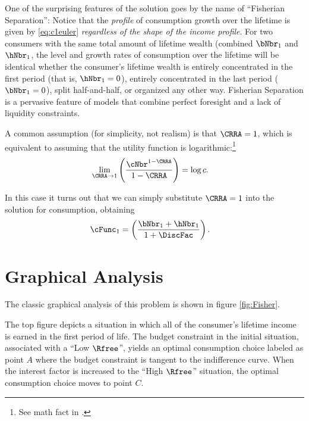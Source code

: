   One of the surprising features of the solution goes by the name of ``Fisherian Separation'':  Notice that the \textit{profile} of consumption growth over the lifetime is given by \eqref{eq:c1euler} \textit{regardless of the shape of the income profile}.  For two consumers with the same total amount of lifetime wealth (combined $\bNbr_{1}$ and $\hNbr_{1}$, the level and growth rates of consumption over the lifetime will be identical whether the consumer's lifetime wealth is entirely concentrated in the first period (that is, $\hNbr_{1}=0$), entirely concentrated in the last period ($\bNbr_{1}=0$), split half-and-half, or organized any other way. Fisherian Separation is a pervasive feature of models that combine perfect foresight and a lack of liquidity constraints.

  A common assumption (for simplicity, not realism) is that $\CRRA=1$, which
  is equivalent to assuming that the utility function is logarithmic:\footnote{See
    math fact \CRRALim in \MathFactsList.}
  \begin{equation}\begin{gathered}\begin{aligned}
        \lim_{\CRRA \rightarrow 1} \left(\frac{\cNbr^{1-\CRRA}}{1-\CRRA}\right) & =  \log c.
      \end{aligned}\end{gathered}\end{equation}

  In this case it turns out that we can simply substitute $\CRRA=1$ into the
  solution for consumption, obtaining
  \begin{equation}\begin{gathered}\begin{aligned}
        \cFunc_{1} & =  \left(\frac{\bNbr_{1}+\hNbr_{1}}{1+\DiscFac}\right).
      \end{aligned}\end{gathered}\end{equation}


  \section{Graphical Analysis}

  The classic graphical analysis of this problem is shown in figure \ref{fig:Fisher}.

  The top figure depicts a situation in which all of the consumer's lifetime income is earned in the first period of life.  The budget constraint in the initial situation, associated with a ``Low $\Rfree$'', yields an optimal consumption choice labeled as point $A$ where the budget constraint is tangent to the indifference curve.  When the interest factor is increased to the ``High $\Rfree$'' situation, the optimal consumption choice moves to point $C$.

